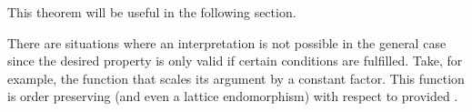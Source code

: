 \begin{isabellebody}
\begin{isamarkuptext}
\begin{isabelle}
\end{isabelle}
  This theorem will be useful in the following section.%
\end{isamarkuptext}%
\isamarkuptrue%
%
\isamarkuptrue%
%
\begin{isamarkuptext}%
There are situations where an interpretation is not possible
  in the general case since the desired property is only valid if
  certain conditions are fulfilled.  Take, for example, the function
   that scales its argument by a constant factor.
  This function is order preserving (and even a lattice endomorphism)
  with respect to  provided .


\end{isamarkuptext}
\end{isabellebody}
